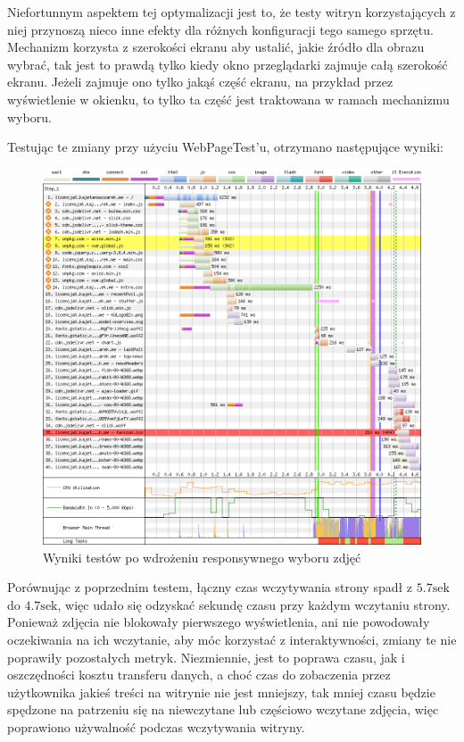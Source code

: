 \documentclass[licencjacka]{pracadypl}
\begin{document}
Niefortunnym aspektem tej optymalizacji jest to, że testy witryn korzystających z niej przynoszą nieco inne efekty dla różnych konfiguracji tego samego sprzętu. Mechanizm korzysta z szerokości ekranu aby ustalić, jakie źródło dla obrazu wybrać, tak jest to prawdą tylko kiedy okno przeglądarki zajmuje całą szerokość ekranu. Jeżeli zajmuje ono tylko jakąś część ekranu, na przykład przez wyświetlenie w okienku, to tylko ta część jest traktowana w ramach mechanizmu wyboru.

Testując te zmiany przy użyciu WebPageTest'u, otrzymano następujące wyniki:

\begin{figure}[H]
  \includegraphics[width=\linewidth]{images/waterfall-after-sizing.png}
  \caption{Wyniki testów po wdrożeniu responsywnego wyboru zdjęć}
  \label{fig:waterfall-after-sizing}
\end{figure}

Porównując z poprzednim testem, łączny czas wczytywania strony spadł z $5.7\text{sek}$ do $4.7\text{sek}$, więc udało się odzyskać sekundę czasu przy każdym wczytaniu strony. Ponieważ zdjęcia nie blokowały pierwszego wyświetlenia, ani nie powodowały oczekiwania na ich wczytanie, aby móc korzystać z interaktywności, zmiany te nie poprawiły pozostałych metryk. Niezmiennie, jest to poprawa czasu, jak i oszczędności kosztu transferu danych, a choć czas do zobaczenia przez użytkownika jakieś treści na witrynie nie jest mniejszy, tak mniej czasu będzie spędzone na patrzeniu się na niewczytane lub częściowo wczytane zdjęcia, więc poprawiono używalność podczas wczytywania witryny.
\end{document}
